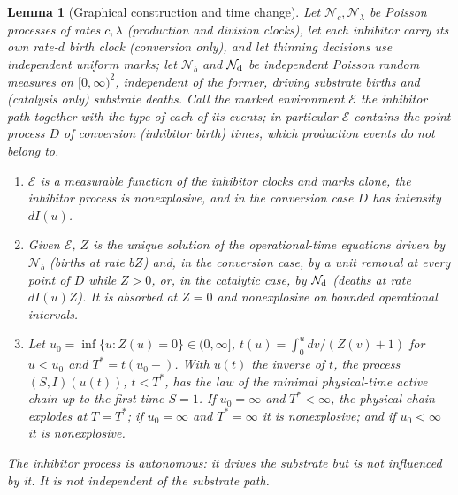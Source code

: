 \documentclass[11pt,a4paper]{article}
\numberwithin{equation}{section}
\newtheorem{lemma}[theorem]{Lemma}
\theoremstyle{definition}\newtheorem{definition}[theorem]{Definition}
\theoremstyle{remark}\newtheorem{remark}[theorem]{Remark}\newtheorem{example}[theorem]{Example}
\begin{document}
\begin{lemma}[Graphical construction and time change]\label{lem:timechange}
Let $\mathcal N_c,\mathcal N_\lambda$ be Poisson processes of rates $c,\lambda$ (production and division clocks), let each inhibitor carry its own rate-$d$ birth clock (conversion only), and let thinning decisions use independent uniform marks; let $\mathcal N_b$ and $\mathcal N_{\rm d}$ be independent Poisson random measures on $[0,\infty)^2$, independent of the former, driving substrate births and (catalysis only) substrate deaths. Call the \emph{marked environment} $\mathcal E$ the inhibitor path together with the type of each of its events; in particular $\mathcal E$ contains the point process $D$ of conversion (inhibitor birth) times, which production events do not belong to.
\begin{enumerate}[label=(\alph*)]
\item $\mathcal E$ is a measurable function of the inhibitor clocks and marks alone, the inhibitor process is nonexplosive, and in the conversion case $D$ has intensity $dI(u)$.
\item Given $\mathcal E$, $Z$ is the unique solution of the operational-time equations driven by $\mathcal N_b$ (births at rate $bZ$) and, in the conversion case, by a unit removal at every point of $D$ while $Z>0$, or, in the catalytic case, by $\mathcal N_{\rm d}$ (deaths at rate $dI(u)Z$). It is absorbed at $Z=0$ and nonexplosive on bounded operational intervals.
\item Let $u_0=\inf\{u:Z(u)=0\}\in(0,\infty]$, $t(u)=\int_0^u dv/(Z(v)+1)$ for $u<u_0$ and $T^*=t(u_0-)$. With $u(t)$ the inverse of $t$, the process $(S,I)(u(t))$, $t<T^*$, has the law of the minimal physical-time active chain up to the first time $S=1$. If $u_0=\infty$ and $T^*<\infty$, the physical chain explodes at $T=T^*$; if $u_0=\infty$ and $T^*=\infty$ it is nonexplosive; and if $u_0<\infty$ it is nonexplosive.
\end{enumerate}
The inhibitor process is autonomous: it drives the substrate but is not influenced by it. It is not independent of the substrate path.
\end{lemma}
\end{document}
